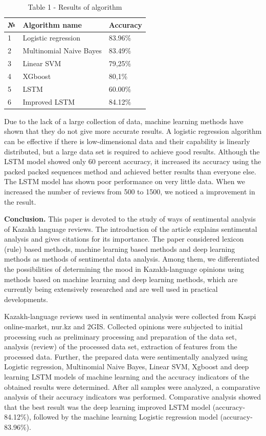 \begin{table}[H]
\caption*{Table 1 - Results of algorithm}
\centering
\begin{tabular}{|l|l|l|}
\hline
№ & Algorithm name              & Accuracy \\ \hline
1 & Logistic regression         & 83.96\%  \\ \hline
2 & Multinomial Naive Bayes     & 83.49\%  \\ \hline
3 & Linear SVM                  & 79,25\%  \\ \hline
4 & XGboost                     & 80,1\%   \\ \hline
5 & LSTM                        & 60.00\%  \\ \hline
6 & Improved LSTM               & 84.12\%  \\ \hline
\end{tabular}
\end{table}

\begin{multicols}{2}
Due to the lack of a large collection of data, machine learning methods
have shown that they do not give more accurate results. A logistic
regression algorithm can be effective if there is low-dimensional data
and their capability is linearly distributed, but a large data set is
required to achieve good results. Although the LSTM model showed only 60
percent accuracy, it increased its accuracy using the packed packed
sequences method and achieved better results than everyone else. The
LSTM model has shown poor performance on very little data. When we
increased the number of reviews from 500 to 1500, we noticed a
improvement in the result.

{\bfseries Conclusion.} This paper is devoted to the study of ways of
sentimental analysis of Kazakh language reviews. The introduction of the
article explains sentimental analysis and gives citations for its
importance. The paper considered lexicon (rule) based methods, machine
learning based methods and deep learning methods as methods of
sentimental data analysis. Among them, we differentiated the
possibilities of determining the mood in Kazakh-language opinions using
methods based on machine learning and deep learning methods, which are
currently being extensively researched and are well used in practical
developments.

Kazakh-language reviews used in sentimental analysis were collected from
Kaspi online-market, nur.kz and 2GIS. Collected opinions were subjected
to initial processing such as preliminary processing and preparation of
the data set, analysis (review) of the processed data set, extraction of
features from the processed data. Further, the prepared data were
sentimentally analyzed using Logistic regression, Multinomial Naive
Bayes, Linear SVM, Xgboost and deep learning LSTM models of machine
learning and the accuracy indicators of the obtained results were
determined. After all samples were analyzed, a comparative analysis of
their accuracy indicators was performed. Comparative analysis showed
that the best result was the deep learning improved LSTM model
(accuracy-84.12\%), followed by the machine learning Logistic regression
model (accuracy-83.96\%).
\end{multicols}

